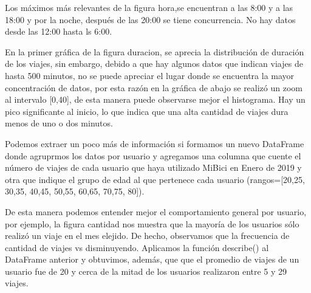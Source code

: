 \documentclass[letterpaper,spanish,reprint,nofootinbib,showkeys,aps]{revtex4-2}
\begin{document}
Los máximos más relevantes de la figura {hora},se encuentran a las 8:00 y a las 18:00 y por la noche, después de las 20:00 se tiene concurrencia. No 
hay datos desde las 12:00 hasta ls 6:00.


En la primer gráfica de la figura {duracion}, se aprecia la distribución de duración de los viajes, sin embargo, debido a que hay algunos datos
que indican viajes de hasta 500 minutos, no se puede apreciar el lugar donde se encuentra la mayor concentración de datos,
por esta razón en la gráfica de abajo se realizó un zoom al intervalo [0,40], de esta manera puede observarse
mejor el histograma.
Hay un pico significante al inicio, lo que indica que una alta cantidad de viajes dura menos de uno o dos minutos. 


Podemos extraer un poco más de información si formamos un nuevo DataFrame donde
agruprmos los datos por usuario y agregamos una columna
que cuente el número de viajes de cada usuario que haya utilizado MiBici en Enero de 2019 y otra que indique 
el grupo de edad al que pertenece cada usuario (rangos=[20,25, 30,35, 40,45, 50,55, 60,65, 70,75, 80]).



De esta manera podemos entender mejor el comportamiento general por usuario, por ejemplo, la figura {cantidad} 
nos muestra que la mayoría de los usuarios sólo realizó un viaje en el mes elejido. De hecho, observamos que la frecuencia de cantidad de viajes
vs disminuyendo.  
Aplicamos la función describe()
al DataFrame anterior y obtuvimos, además, que que el promedio de viajes de un usuario
fue de 20 y cerca de la mitad de los usuarios realizaron entre 5 y 29 viajes.
\end{document}
